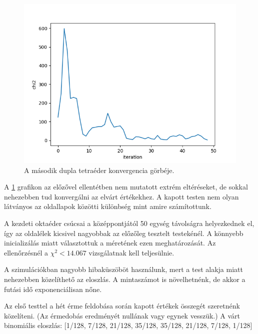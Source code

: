 \begin{figure}[h!]
	\centering
	\includegraphics[scale=0.7]{images/doubletetrahedron_02.png}
	\caption{A második dupla tetraéder konvergencia görbéje.}
	\label{fig:doubletetra02}
\end{figure}

A \ref{fig:doubletetra02} grafikon az előzővel ellentétben nem mutatott extrém eltéréseket, de sokkal nehezebben tud konvergálni az elvárt értékekhez.
A kapott testen nem olyan látványos az oldallapok közötti különbség mint amire számítottunk.

\newpage


A kezdeti oktaéder csúcsai a középpontjától 50 egység távolságra helyezkednek el, így az oldalélek kicsivel nagyobbak az előzőleg tesztelt testekénél.
A könnyebb inicializálás miatt választottuk a méretének ezen meghatározását.
Az ellenőrzésnél a $\chi^2 < 14.067$ vizsgálatnak kell teljesülnie.

\begin{remark}
A szimulációkban nagyobb hibaküszöböt használunk, mert a test alakja miatt nehezebben közelíthető az eloszlás.
A mintaszámot is növelhetnénk, de akkor a futási idő exponenciálisan nőne.
\end{remark}

Az első testtel a hét érme feldobása során kapott értékek összegét szeretnénk közelíteni.
(Az érmedobás eredményét nullának vagy egynek vesszük.)
A várt binomiális eloszlás: [1/128, 7/128, 21/128, 35/128, 35/128, 21/128, 7/128, 1/128]


